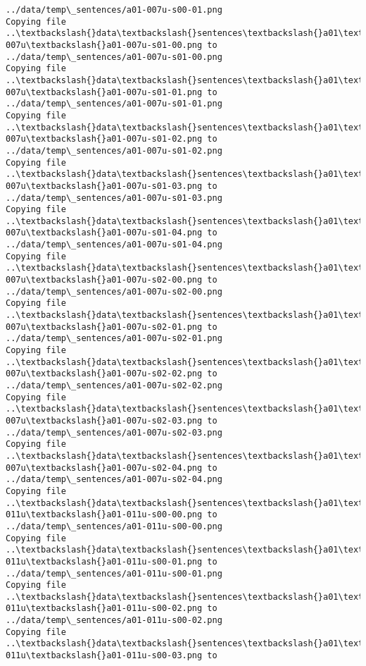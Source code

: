 \documentclass[11pt]{article}
\begin{document}
\begin{Verbatim}[commandchars=\\\{\}]
../data/temp\_sentences/a01-007u-s00-01.png
Copying file ..\textbackslash{}data\textbackslash{}sentences\textbackslash{}a01\textbackslash{}a01-007u\textbackslash{}a01-007u-s01-00.png to
../data/temp\_sentences/a01-007u-s01-00.png
Copying file ..\textbackslash{}data\textbackslash{}sentences\textbackslash{}a01\textbackslash{}a01-007u\textbackslash{}a01-007u-s01-01.png to
../data/temp\_sentences/a01-007u-s01-01.png
Copying file ..\textbackslash{}data\textbackslash{}sentences\textbackslash{}a01\textbackslash{}a01-007u\textbackslash{}a01-007u-s01-02.png to
../data/temp\_sentences/a01-007u-s01-02.png
Copying file ..\textbackslash{}data\textbackslash{}sentences\textbackslash{}a01\textbackslash{}a01-007u\textbackslash{}a01-007u-s01-03.png to
../data/temp\_sentences/a01-007u-s01-03.png
Copying file ..\textbackslash{}data\textbackslash{}sentences\textbackslash{}a01\textbackslash{}a01-007u\textbackslash{}a01-007u-s01-04.png to
../data/temp\_sentences/a01-007u-s01-04.png
Copying file ..\textbackslash{}data\textbackslash{}sentences\textbackslash{}a01\textbackslash{}a01-007u\textbackslash{}a01-007u-s02-00.png to
../data/temp\_sentences/a01-007u-s02-00.png
Copying file ..\textbackslash{}data\textbackslash{}sentences\textbackslash{}a01\textbackslash{}a01-007u\textbackslash{}a01-007u-s02-01.png to
../data/temp\_sentences/a01-007u-s02-01.png
Copying file ..\textbackslash{}data\textbackslash{}sentences\textbackslash{}a01\textbackslash{}a01-007u\textbackslash{}a01-007u-s02-02.png to
../data/temp\_sentences/a01-007u-s02-02.png
Copying file ..\textbackslash{}data\textbackslash{}sentences\textbackslash{}a01\textbackslash{}a01-007u\textbackslash{}a01-007u-s02-03.png to
../data/temp\_sentences/a01-007u-s02-03.png
Copying file ..\textbackslash{}data\textbackslash{}sentences\textbackslash{}a01\textbackslash{}a01-007u\textbackslash{}a01-007u-s02-04.png to
../data/temp\_sentences/a01-007u-s02-04.png
Copying file ..\textbackslash{}data\textbackslash{}sentences\textbackslash{}a01\textbackslash{}a01-011u\textbackslash{}a01-011u-s00-00.png to
../data/temp\_sentences/a01-011u-s00-00.png
Copying file ..\textbackslash{}data\textbackslash{}sentences\textbackslash{}a01\textbackslash{}a01-011u\textbackslash{}a01-011u-s00-01.png to
../data/temp\_sentences/a01-011u-s00-01.png
Copying file ..\textbackslash{}data\textbackslash{}sentences\textbackslash{}a01\textbackslash{}a01-011u\textbackslash{}a01-011u-s00-02.png to
../data/temp\_sentences/a01-011u-s00-02.png
Copying file ..\textbackslash{}data\textbackslash{}sentences\textbackslash{}a01\textbackslash{}a01-011u\textbackslash{}a01-011u-s00-03.png to

\end{Verbatim}
\end{document}
